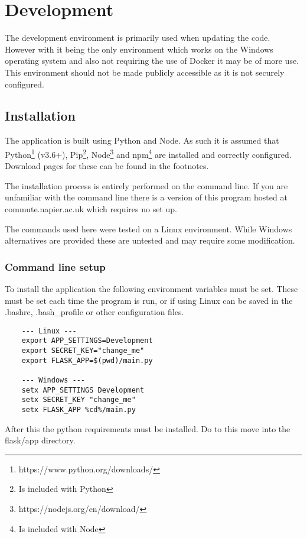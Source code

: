 \section{Development}

The development environment is primarily used when updating the code.  However with it being the only environment which works on the Windows operating system and also not requiring the use of Docker it may be of more use.  This environment should not be made publicly accessible as it is not securely configured.

\subsection{Installation}

The application is built using Python and Node.  As such it is assumed that Python\footnote{https://www.python.org/downloads/} (v3.6+), Pip\footnote{Is included with Python}, Node\footnote{https://nodejs.org/en/download/} and npm\footnote{Is included with Node} are installed and correctly configured.  Download pages for these can be found in the footnotes.

The installation process is entirely performed on the command line.  If you are unfamiliar with the command line there is a version of this program hosted at commute.napier.ac.uk which requires no set up.

The commands used here were tested on a Linux environment.  While Windows alternatives are provided these are untested and may require some modification.

\subsubsection{Command line setup}

To install the application the following environment variables must be set.  These must be set each time the program is run, or if using Linux can be saved in the .bashrc, .bash\_profile or other configuration files.

\begin{verbatim}
	--- Linux ---
	export APP_SETTINGS=Development
	export SECRET_KEY="change_me"
	export FLASK_APP=$(pwd)/main.py
	
	--- Windows ---
	setx APP_SETTINGS Development
	setx SECRET_KEY "change_me"
	setx FLASK_APP %cd%/main.py
\end{verbatim}

After this the python requirements must be installed.  Do to this move into the flask/app directory.

